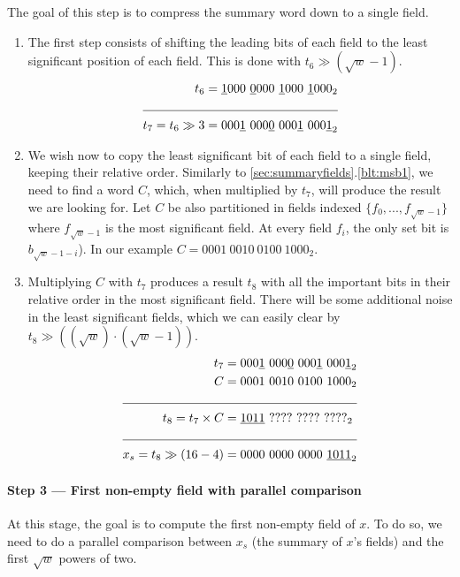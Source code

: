The goal of this step is to compress the summary word down to a single field.

\begin{enumerate}
    \item \label{blt:summCompression1}
    The first step consists of shifting the leading bits of each field to the least significant position of each field. This is done with $t_6 \gg (\sqrt{w} - 1)$. 
    \begin{align*}
                    t_6 &= \underline{1}000\ \underline{0}000\ \underline{1}000\ \underline{1}000_2 \\ \cline{1-2} 
        t_7 = t_6 \gg 3 &= 000\underline{1}\ 000\underline{0}\ 000\underline{1}\ 000\underline{1}_2
    \end{align*}
    
    \item \label{blt:summCompression2}
    We wish now to copy the least significant bit of each field to a single field, keeping their relative order.
    Similarly to \ref{sec:summaryfields}.\ref{blt:msb1}, we need to find a word $C$, which, when multiplied by $t_7$, will produce the result we are looking for.
    Let $C$ be also partitioned in fields indexed $\{f_0, ..., f_{\sqrt{w} - 1}\}$ where $f_{\sqrt{w} - 1}$ is the most significant field. At every field $f_i$, the only set bit is $b_{\sqrt{w} - 1 - i}$).
    In our example $C = 0001\ 0010\ 0100\ 1000_2$.
    
    \item \label{blt:summCompression3}
    Multiplying $C$ with $t_7$ produces a result $t_8$ with all the important bits in their relative order in the most significant field. There will be some additional noise in the least significant fields, which we can easily clear by $t_8 \gg ((\sqrt{w})\cdot(\sqrt{w} - 1))$.
        \begin{align*}
                         t_7 &= 000\underline{1}\ 000\underline{0}\ 000\underline{1}\ 000\underline{1}_2 \\
                           C &= 0001\ 0010\ 0100\ 1000_2 \\ \cline{1-2} 
          t_8 = t_7 \times C &= \underline{1011}\ ????\ ????\ ????_2\\ \cline{1-2}
        x_s = t_8 \gg (16-4) &= 0000\ 0000\ 0000\ \underline{1011}_2
    \end{align*}
\end{enumerate}

\paragraph{Step 3 --- First non-empty field with parallel comparison} \label{sec:parallel}
At this stage, the goal is to compute the first non-empty field of $x$. To do so, we need to do a parallel comparison between $x_s$ (the summary of $x$'s fields) and the first $\sqrt{w}$ powers of two.

